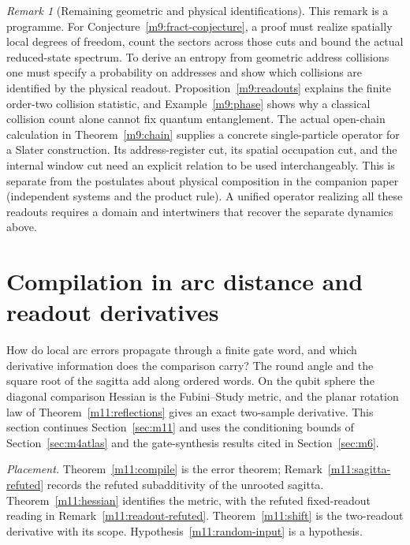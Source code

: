 \documentclass[11pt,reqno]{amsart}
\theoremstyle{definition}
\theoremstyle{remark}
\newtheorem{remark}[theorem]{Remark}
\numberwithin{equation}{section}
\begin{document}
\begin{remark}[Remaining geometric and physical identifications]\label{m9:programme}
This remark is a programme. For Conjecture~\ref{m9:fract-conjecture}, a proof must realize
spatially local degrees of freedom, count the sectors across
those cuts and bound the actual reduced-state spectrum. To
derive an entropy from geometric address collisions one must
specify a probability on addresses and show which collisions
are identified by the physical readout. Proposition~\ref{m9:readouts}
explains the finite order-two collision statistic, and
Example~\ref{m9:phase} shows why a classical collision count
alone cannot fix quantum entanglement. The actual open-chain
calculation in Theorem~\ref{m9:chain} supplies a concrete
single-particle operator for a Slater construction. Its
address-register cut, its spatial occupation cut, and the
internal window cut need an explicit relation to be used
interchangeably. This is separate from the postulates about
physical composition in the companion paper \cite{Companion}
(independent systems and the product rule). A unified operator realizing
all these readouts requires a domain and intertwiners that
recover the separate dynamics above.
\end{remark}

\section{Compilation in arc distance and readout derivatives}\label{sec:m11b}

How do local arc errors propagate through a finite gate word, and which
derivative information does the comparison carry? The round angle and the
square root of the sagitta add along ordered words. On the qubit sphere the diagonal comparison
Hessian is the Fubini--Study metric, and the planar rotation law of
Theorem~\ref{m11:reflections} gives an exact two-sample derivative. This
section continues Section~\ref{sec:m11} and uses the conditioning bounds of
Section~\ref{sec:m4atlas} and the gate-synthesis results cited in
Section~\ref{sec:m6}.

\emph{Placement.} Theorem~\ref{m11:compile} is the error theorem;
Remark~\ref{m11:sagitta-refuted} records the refuted subadditivity of the
unrooted sagitta. Theorem~\ref{m11:hessian} identifies the metric, with the
refuted fixed-readout reading in Remark~\ref{m11:readout-refuted}.
Theorem~\ref{m11:shift} is the two-readout derivative with its scope.
Hypothesis~\ref{m11:random-input} is a hypothesis.
\end{document}
